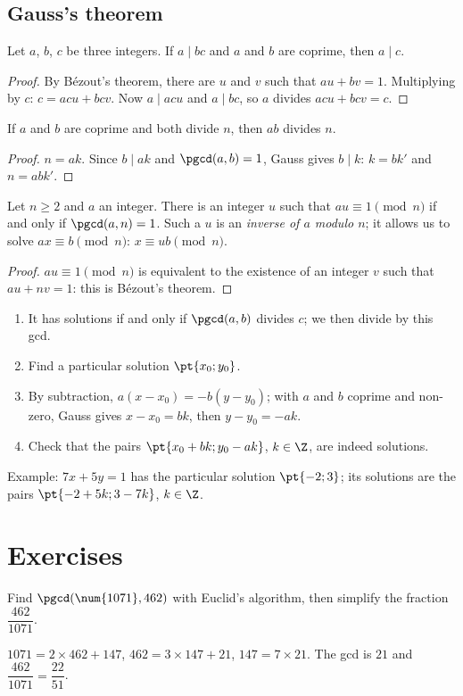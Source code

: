 \subsection{Gauss's theorem}
\begin{theorem}
Let $a$, $b$, $c$ be three integers. If $a\mid bc$ and $a$ and $b$ are coprime, then $a\mid c$.
\end{theorem}
\begin{proof}
By Bézout's theorem, there are $u$ and $v$ such that $au+bv=1$. Multiplying by $c$: $c=acu+bcv$. Now $a\mid acu$ and $a\mid bc$, so $a$ divides $acu+bcv=c$.
\end{proof}
\begin{theorem}[Corollary]
If $a$ and $b$ are coprime and both divide $n$, then $ab$ divides $n$.
\end{theorem}
\begin{proof}
$n=ak$. Since $b\mid ak$ and $\pgcd(a,b)=1$, Gauss gives $b\mid k$: $k=bk'$ and $n=abk'$.
\end{proof}
\begin{theorem}
Let $n\ge2$ and $a$ an integer. There is an integer $u$ such that $au\equiv1\pmod n$ if and only if $\pgcd(a,n)=1$. Such a $u$ is an \emph{inverse of $a$ modulo $n$}; it allows us to solve $ax\equiv b\pmod n$: $x\equiv ub\pmod n$.
\end{theorem}
\begin{proof}
$au\equiv1\pmod n$ is equivalent to the existence of an integer $v$ such that $au+nv=1$: this is Bézout's theorem.
\end{proof}
\begin{method}[Equation $ax+by=c$ in integers]
\begin{enumerate}
\item It has solutions if and only if $\pgcd(a,b)$ divides $c$; we then divide by this gcd.
\item Find a particular solution $\pt{x_0;y_0}$.
\item By subtraction, $a(x-x_0)=-b(y-y_0)$; with $a$ and $b$ coprime and non-zero, Gauss gives $x-x_0=bk$, then $y-y_0=-ak$.
\item Check that the pairs $\pt{x_0+bk;y_0-ak}$, $k\in\Z$, are indeed solutions.
\end{enumerate}
Example: $7x+5y=1$ has the particular solution $\pt{-2;3}$; its solutions are the pairs $\pt{-2+5k;3-7k}$, $k\in\Z$.
\end{method}

\mxnewpage
\section{Exercises}
\begin{exercise}
Find $\pgcd(\num{1071},462)$ with Euclid's algorithm, then simplify the fraction $\dfrac{462}{\num{1071}}$.
\end{exercise}
\begin{solution}
$\num{1071}=2\times462+147$, $462=3\times147+21$, $147=7\times21$. The gcd is $21$ and $\dfrac{462}{\num{1071}}=\dfrac{22}{51}$.
\end{solution}

